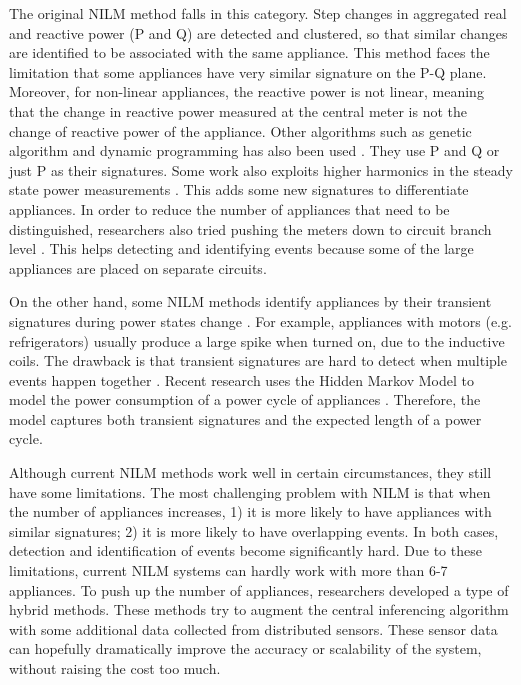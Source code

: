 The original NILM method \cite{Hart1992} falls in this category. Step changes in aggregated real and reactive power (P and Q) are detected and clustered, so that similar changes are identified to be associated with the same appliance. This method faces the limitation that some appliances have very similar signature on the P-Q plane. Moreover, for non-linear appliances, the reactive power is not linear, meaning that the change in reactive power measured at the central meter is not the change of reactive power of the appliance. Other algorithms such as genetic algorithm and dynamic programming has also been used \cite{Baranski2004,Baranski2004a}. They use P and Q or just P as their signatures. 
Some work also exploits higher harmonics in the steady state power measurements \cite{Laughman2003}. This adds some new signatures to differentiate appliances. 
In order to reduce the number of appliances that need to be distinguished, researchers also tried pushing the meters down to circuit branch level \cite{Marchiori2011}. This helps detecting and identifying events because some of the large appliances are placed on separate circuits. 

On the other hand, some NILM methods identify appliances by their transient signatures during power states change \cite{Leeb1995,Cox2006}. For example, appliances with motors (e.g. refrigerators) usually produce a large spike when turned on, due to the inductive coils. The drawback is that transient signatures are hard to detect when multiple events happen together \cite{Leeb1995}. Recent research uses the Hidden Markov Model to model the power consumption of a power cycle of appliances \cite{Kolter2012}. Therefore, the model captures both transient signatures and the expected length of a power cycle. 

Although current NILM methods work well in certain circumstances, they still have some limitations. The most challenging problem with NILM is that when the number of appliances increases, 1) it is more likely to have appliances with similar signatures; 2) it is more likely to have overlapping events. In both cases, detection and identification of events become significantly hard. Due to these limitations, current NILM systems can hardly work with more than 6-7 appliances. 
To push up the number of appliances, researchers developed a type of hybrid methods. These methods try to augment the central inferencing algorithm with some additional data collected from distributed sensors. These sensor data can hopefully dramatically improve the accuracy or scalability of the system, without raising the cost too much. 


